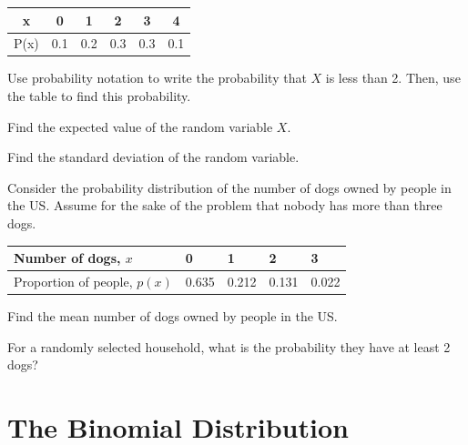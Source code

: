 \documentclass[
]{book}
\begin{document}
\begin{longtable}[]{@{}cccccc@{}}
\toprule\noalign{}
x & 0 & 1 & 2 & 3 & 4 \\
\midrule\noalign{}
\endhead
\bottomrule\noalign{}
\endlastfoot
P(x) & 0.1 & 0.2 & 0.3 & 0.3 & 0.1 \\
\end{longtable}

Use probability notation to write the probability that \(X\) is less than 2. Then, use the table to find this probability.

Find the expected value of the random variable \(X\).

Find the standard deviation of the random variable.

Consider the probability distribution of the number of dogs owned by people in the US. Assume for the sake of the problem that nobody has more than three dogs.

\begin{longtable}[]{@{}lllll@{}}
\toprule\noalign{}
Number of dogs, \(x\) & 0 & 1 & 2 & 3 \\
\midrule\noalign{}
\endhead
\bottomrule\noalign{}
\endlastfoot
Proportion of people, \(p(x)\) & 0.635 & 0.212 & 0.131 & 0.022 \\
\end{longtable}

Find the mean number of dogs owned by people in the US.

For a randomly selected household, what is the probability they have at least 2 dogs?

\section{The Binomial Distribution}\label{the-binomial-distribution}
\end{document}
